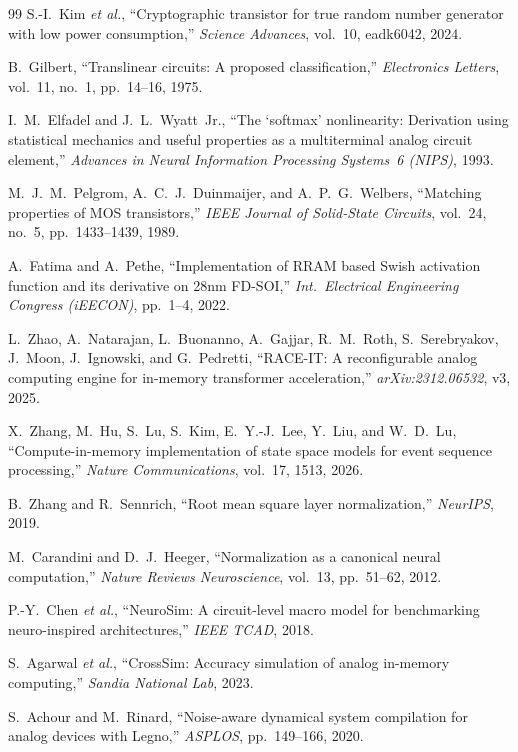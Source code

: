 \documentclass[11pt]{article}
\begin{document}
\begin{thebibliography}{99}
 S.-I.~Kim \textit{et al.}, ``Cryptographic transistor for true random number generator with low power consumption,'' \textit{Science Advances}, vol.~10, eadk6042, 2024.

 B.~Gilbert, ``Translinear circuits: A proposed classification,'' \textit{Electronics Letters}, vol.~11, no.~1, pp.~14--16, 1975.

 I.~M.~Elfadel and J.~L.~Wyatt~Jr., ``The `softmax' nonlinearity: Derivation using statistical mechanics and useful properties as a multiterminal analog circuit element,'' \textit{Advances in Neural Information Processing Systems~6 (NIPS)}, 1993.

 M.~J.~M.~Pelgrom, A.~C.~J.~Duinmaijer, and A.~P.~G.~Welbers, ``Matching properties of MOS transistors,'' \textit{IEEE Journal of Solid-State Circuits}, vol.~24, no.~5, pp.~1433--1439, 1989.

 A.~Fatima and A.~Pethe, ``Implementation of RRAM based Swish activation function and its derivative on 28nm FD-SOI,'' \textit{Int.\ Electrical Engineering Congress (iEECON)}, pp.~1--4, 2022.

 L.~Zhao, A.~Natarajan, L.~Buonanno, A.~Gajjar, R.~M.~Roth, S.~Serebryakov, J.~Moon, J.~Ignowski, and G.~Pedretti, ``RACE-IT: A reconfigurable analog computing engine for in-memory transformer acceleration,'' \textit{arXiv:2312.06532}, v3, 2025.

 X.~Zhang, M.~Hu, S.~Lu, S.~Kim, E.~Y.-J.~Lee, Y.~Liu, and W.~D.~Lu, ``Compute-in-memory implementation of state space models for event sequence processing,'' \textit{Nature Communications}, vol.~17, 1513, 2026.

 B.~Zhang and R.~Sennrich, ``Root mean square layer normalization,'' \textit{NeurIPS}, 2019.

 M.~Carandini and D.~J.~Heeger, ``Normalization as a canonical neural computation,'' \textit{Nature Reviews Neuroscience}, vol.~13, pp.~51--62, 2012.

 P.-Y.~Chen \textit{et al.}, ``NeuroSim: A circuit-level macro model for benchmarking neuro-inspired architectures,'' \textit{IEEE TCAD}, 2018.

 S.~Agarwal \textit{et al.}, ``CrossSim: Accuracy simulation of analog in-memory computing,'' \textit{Sandia National Lab}, 2023.

 S.~Achour and M.~Rinard, ``Noise-aware dynamical system compilation for analog devices with Legno,'' \textit{ASPLOS}, pp.~149--166, 2020.


\end{thebibliography}
\end{document}

